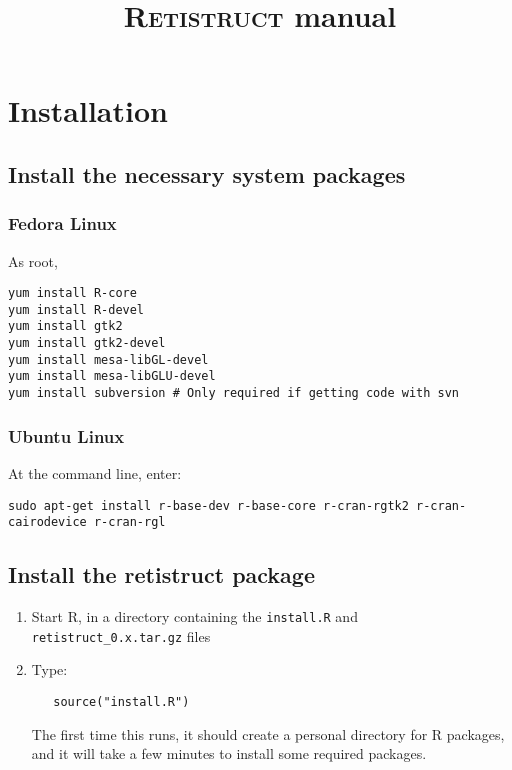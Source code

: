 \documentclass{article}
\title{\textsc{Retistruct} manual}
\begin{document}
\maketitle
\thispagestyle{myheadings}

\section{Installation}
\label{manual:sec:installation}

\subsection{Install the necessary system packages}

\subsubsection{Fedora Linux }

As root,

\begin{verbatim}
yum install R-core
yum install R-devel
yum install gtk2
yum install gtk2-devel
yum install mesa-libGL-devel
yum install mesa-libGLU-devel
yum install subversion # Only required if getting code with svn
\end{verbatim}

\subsubsection{Ubuntu Linux}
At the command line, enter:

\begin{verbatim}
sudo apt-get install r-base-dev r-base-core r-cran-rgtk2 r-cran-cairodevice r-cran-rgl
\end{verbatim}

\subsection{Install the retistruct package}

\begin{enumerate}
\item Start \textsc{R}, in a directory containing the \texttt{install.R} and
   \texttt{retistruct\_0.x.tar.gz} files
 \item  Type:
\begin{verbatim}
   source("install.R")
\end{verbatim}
   The first time this runs, it should create a personal directory for
   R packages, and it will take a few minutes to install some required
   packages.
\end{enumerate}
\end{document}
